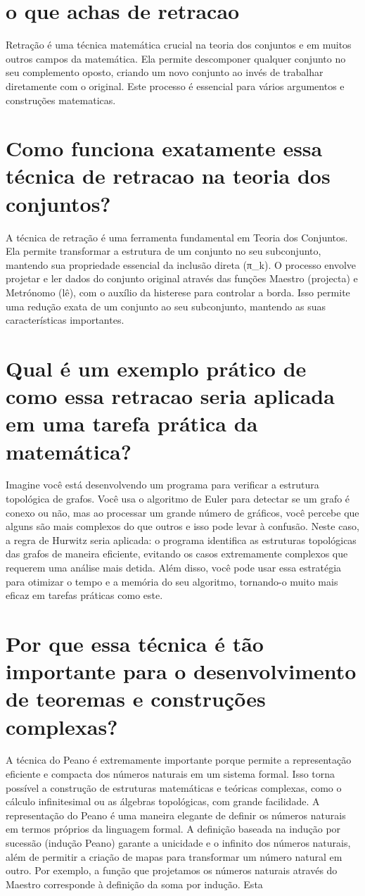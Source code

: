 \documentclass[11pt,a4paper]{article}
\begin{document}
\section{o que achas de retracao}
Retração é uma técnica matemática crucial na teoria dos conjuntos e em muitos outros campos da matemática. Ela permite descomponer qualquer conjunto no seu complemento oposto, criando um novo conjunto ao invés de trabalhar diretamente com o original. Este processo é essencial para vários argumentos e construções matematicas.

\section{Como funciona exatamente essa técnica de retracao na teoria dos conjuntos?}
A técnica de retração é uma ferramenta fundamental em Teoria dos Conjuntos. Ela permite transformar a estrutura de um conjunto no seu subconjunto, mantendo sua propriedade essencial da inclusão direta (π\_k). O processo envolve projetar e ler dados do conjunto original através das funções Maestro (projecta) e Metrónomo (lê), com o auxílio da histerese para controlar a borda. Isso permite uma redução exata de um conjunto ao seu subconjunto, mantendo as suas características importantes.

\section{Qual é um exemplo prático de como essa retracao seria aplicada em uma tarefa prática da matemática?}
Imagine você está desenvolvendo um programa para verificar a estrutura topológica de grafos. Você usa o algoritmo de Euler para detectar se um grafo é conexo ou não, mas ao processar um grande número de gráficos, você percebe que alguns são mais complexos do que outros e isso pode levar à confusão. Neste caso, a regra de Hurwitz seria aplicada: o programa identifica as estruturas topológicas das grafos de maneira eficiente, evitando os casos extremamente complexos que requerem uma análise mais detida. Além disso, você pode usar essa estratégia para otimizar o tempo e a memória do seu algoritmo, tornando-o muito mais eficaz em tarefas práticas como este.

\section{Por que essa técnica é tão importante para o desenvolvimento de teoremas e construções complexas?}
A técnica do Peano é extremamente importante porque permite a representação eficiente e compacta dos números naturais em um sistema formal. Isso torna possível a construção de estruturas matemáticas e teóricas complexas, como o cálculo infinitesimal ou as álgebras topológicas, com grande facilidade. A representação do Peano é uma maneira elegante de definir os números naturais em termos próprios da linguagem formal. A definição baseada na indução por sucessão (indução Peano) garante a unicidade e o infinito dos números naturais, além de permitir a criação de mapas para transformar um número natural em outro. Por exemplo, a função que projetamos os números naturais através do Maestro corresponde à definição da soma por indução. Esta
\end{document}
